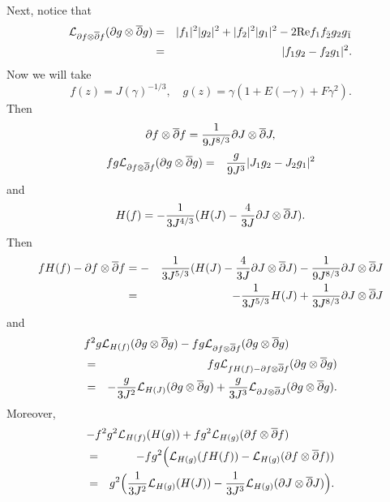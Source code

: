 \documentclass[12pt]{amsart}
\def\d{\partial}
\def\dbar{\overline{\partial}}
\def\d{\partial}
\def\cal{\mathcal}
\begin{document}
Next, notice that
\begin{eqnarray}
{\cal L}_{\d f\otimes \dbar f}(\d g\otimes \dbar g)
&=&|f_1|^2 |g_2|^2+|f_2|^2 |g_1|^2-2\hbox{Re} f_1 f_{\bar 2} g_2 g_{\bar1}\nonumber\\
&=&|f_1 g_2-f_2 g_1|^2.
\end{eqnarray}
Now we will take
\begin{equation}
f(z)=J(\gamma)^{-1/3},\quad g(z)=\gamma(1+E(-\gamma)+F \gamma^2).
\end{equation}
Then
$$
\d f\otimes \dbar f={1\over 9 J^{8/3}} \d J\otimes \dbar J,
$$
\begin{eqnarray}
fg {\cal L}_{\d f\otimes \dbar f}(\d g\otimes \dbar g)
&=&{g\over 9 J^3} |J_1 g_2-J_2 g_1|^2
\end{eqnarray}
and
$$
H(f)=-{1\over 3 J^{4/3}} (H(J)-{4\over 3J}\d J\otimes \dbar J) .
$$
Then
\begin{eqnarray} \label{f}
f H(f)-\d f\otimes \dbar f
&=-&{1\over 3 J^{5/3}}(H(J)-{4\over 3 J}\d J\otimes \dbar J)-{1\over 9 J^{8/3}} \d J\otimes \dbar J\nonumber\\
&=&-{1\over 3 J^{5/3}}H(J)+{1\over 3 J^{8/3}}\d J\otimes \dbar J
\end{eqnarray}
and
\begin{eqnarray*}
\lefteqn{f^2 g{\cal L}_{H(f)}(\d g\otimes \dbar g)-fg{\cal L}_{\d f\otimes \dbar f}(\d g\otimes \dbar g)}\\
&=& f g {\cal L}_{ f H(f)-\d f\otimes \dbar f}(\d g\otimes \dbar g)\\
&=&-{g\over 3 J^2} {\cal L}_{H(J)} (\d g\otimes \dbar g)+{g \over 3J^3} {\cal L}_{\d J\otimes \dbar J}(\d g\otimes \dbar g).
\end{eqnarray*}
Moreover,
\begin{eqnarray*}
\lefteqn{-f^2 g^2 {\cal L}_{H(f)}(H(g))+f g^2{\cal L}_{H(g)}(\d f\otimes\dbar f)}\\
&=&-f g^2 \Big({\cal L}_{H(g)}(f H(f))- {\cal L}_{H(g)}(\d f\otimes \dbar f))\\
&=&  g^2 \Big({1\over 3J^2} {\cal L}_{H(g)}(H(J))-{1\over 3 J^3} {\cal L}_{H(g)}(\d J\otimes \dbar J)\Big).
\end{eqnarray*}
\end{document}
